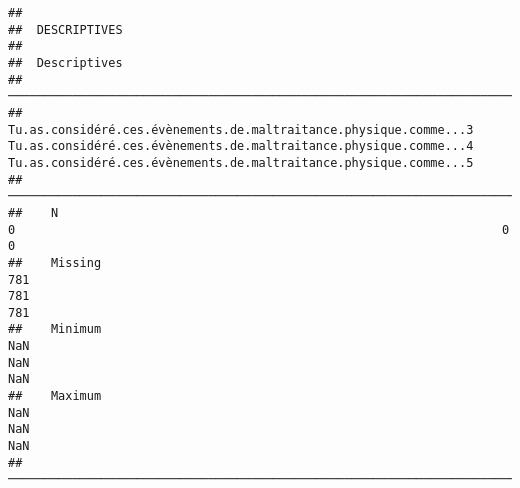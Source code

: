 \documentclass[
]{article}
\begin{document}
\begin{verbatim}
## 
##  DESCRIPTIVES
## 
##  Descriptives                                                                                                                                                                                                               
##  ────────────────────────────────────────────────────────────────────────────────────────────────────────────────────────────────────────────────────────────────────────────────────────────────────────────────────────── 
##               Tu.as.considéré.ces.évènements.de.maltraitance.physique.comme...3    Tu.as.considéré.ces.évènements.de.maltraitance.physique.comme...4    Tu.as.considéré.ces.évènements.de.maltraitance.physique.comme...5   
##  ────────────────────────────────────────────────────────────────────────────────────────────────────────────────────────────────────────────────────────────────────────────────────────────────────────────────────────── 
##    N                                                                          0                                                                    0                                                                    0   
##    Missing                                                                  781                                                                  781                                                                  781   
##    Minimum                                                                  NaN                                                                  NaN                                                                  NaN   
##    Maximum                                                                  NaN                                                                  NaN                                                                  NaN   
##  ──────────────────────────────────────────────────────────────────────────────────────────────────────────────────────────────────────────────────────────────────────────────────────────────────────────────────────────
\end{verbatim}
\end{document}
